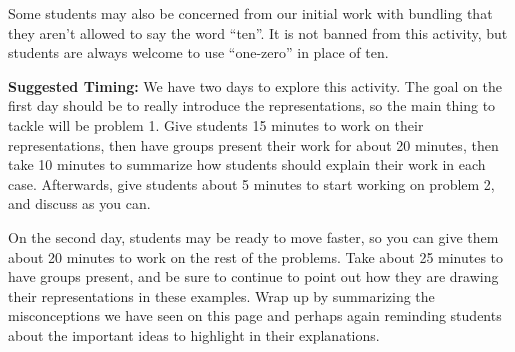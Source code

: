 \documentclass{ximera}
\begin{document}
\begin{instructorNotes}
Some students may also be concerned from our initial work with bundling that they aren't allowed to say the word ``ten''. It is not banned from this activity, but students are always welcome to use ``one-zero'' in place of ten.



{\bf Suggested Timing:} We have two days to explore this activity. The goal on the first day should be to really introduce the representations, so the main thing to tackle will be problem 1. Give students 15 minutes to work on their representations, then have groups present their work for about 20 minutes, then take 10 minutes to summarize how students should explain their work in each case. Afterwards, give students about 5 minutes to start working on problem 2, and discuss as you can.

On the second day, students may be ready to move faster, so you can give them about 20 minutes to work on the rest of the problems. Take about 25 minutes to have groups present, and be sure to continue to point out how they are drawing their representations in these examples. Wrap up by summarizing the misconceptions we have seen on this page and perhaps again reminding students about the important ideas to highlight in their explanations.
\end{instructorNotes}
\end{document}
